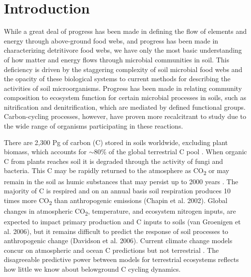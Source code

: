 \section{Introduction}
While a great deal of progress has been made in defining the flow of elements and energy through above-ground food webs, and progress has been made in characterizing detritivore food webs, we have only the most basic understanding of how matter and energy flows through microbial communities in soil. This deficiency is driven by the staggering complexity of soil microbial food webs and the opacity of these biological systems to current methods for describing the activities of soil microorganisms. Progress has been made in relating community composition to ecosystem function for certain microbial processes in soils, such as nitrification and denitrification, which are mediated by defined functional groups. Carbon-cycling processes, however, have proven more recalcitrant to study due to the wide range of organisms participating in these reactions.
 
There are 2,300 Pg of carbon (C) stored in soils worldwide, excluding plant biomass, which accounts for $\sim$80\% of the global terrestrial C pool \cite{Amundson_2001,Mendelsohn_2001,IPCC2007Synth,elsen_Ayres_Wall_Bardgett_2011,Lal_2008,BATJES_1996,Lal_2008}. When organic C from plants reaches soil it is degraded through the activity of fungi and bacteria. This C may be rapidly returned to the atmosphere as CO\textsubscript{2} or may remain in the soil as humic substances that may persist up to 2000 years \cite{yanagita1990natural}. The majority of C is respired and on an annual basis soil respiration produces 10 times more CO\textsubscript{2} than anthropogenic emissions (Chapin et al. 2002). Global changes in atmospheric CO\textsubscript{2}, temperature, and ecosystem nitrogen inputs, are expected to impact primary production and C inputs to soils (van Groenigen et al. 2006), but it remains difficult to predict the response of soil processes to anthropogenic change (Davidson et al. 2006). Current climate change models concur on atmospheric and ocean C predictions but not terrestrial \cite{Friedlingstein_2006}. The disagreeable predictive power between models for terrestrial ecosystems reflects how little we know about belowground C cycling dynamics. 

